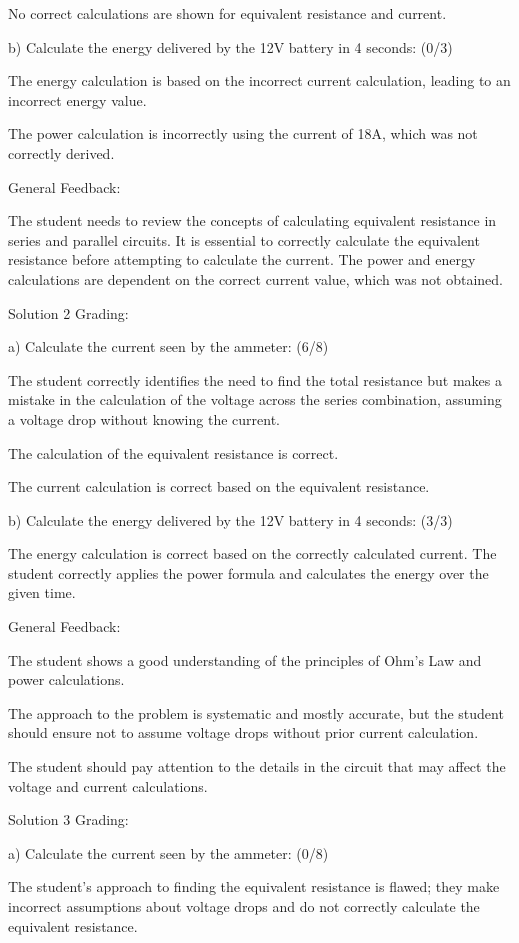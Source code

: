 \documentclass[a4paper,11pt]{article}
\begin{document}
No correct calculations are shown for equivalent resistance and current.

b) Calculate the energy delivered by the 12V battery in 4 seconds: (0/3)

The energy calculation is based on the incorrect current calculation, leading to an incorrect energy value.

The power calculation is incorrectly using the current of 18A, which was not correctly derived.

General Feedback:

The student needs to review the concepts of calculating equivalent resistance in series and parallel circuits.
It is essential to correctly calculate the equivalent resistance before attempting to calculate the current.
The power and energy calculations are dependent on the correct current value, which was not obtained.

Solution 2 Grading:

a) Calculate the current seen by the ammeter: (6/8)

The student correctly identifies the need to find the total resistance but makes a mistake in the calculation of the voltage across the series combination, assuming a voltage drop without knowing the current.

The calculation of the equivalent resistance is correct.

The current calculation is correct based on the equivalent resistance.

b) Calculate the energy delivered by the
12V battery in 4 seconds: (3/3)

The energy calculation is correct based on the correctly calculated current.
The student correctly applies the power formula and calculates the energy over the given time.

General Feedback:

The student shows a good understanding of the principles of Ohm's Law and power calculations.

The approach to the problem is systematic and mostly accurate, but the student should ensure not to assume voltage drops without prior current calculation.

The student should pay attention to the details in the circuit that may affect the voltage and current calculations.

Solution 3 Grading:

a) Calculate the current seen by the ammeter: (0/8)

The student's approach to finding the equivalent resistance is flawed; they make incorrect assumptions about voltage drops and do not correctly calculate the equivalent resistance.
\end{document}
